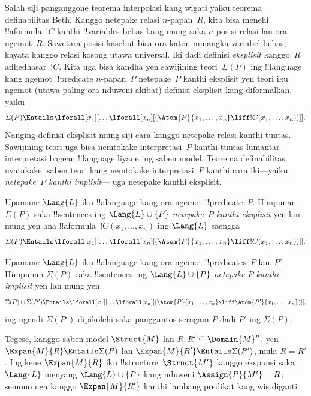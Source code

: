 \documentclass[../../../include/open-logic-section]{subfiles}
\begin{document}


Salah siji panganggone teorema interpolasi kang wigati yaiku
teorema definabilitas Beth. Kanggo netepake relasi
$n$-papan~$R$, kita bisa menehi !!a{formula}~$!C$
kanthi !!{variable}s bebas kang mung saka $n$ posisi relasi lan ora ngemot~$R$. Sawetara posisi kasebut bisa ora katon minangka variabel bebas, kayata kanggo relasi kosong utawa universal.
Iki dadi definisi \emph{eksplisit} kanggo~$R$ adhedhasar~$!C$.
Kita uga bisa kandha yen sawijining teori~$\Sigma(P)$
ing !!{language} kang ngemot !!{predicate}
$n$-papan~$P$ netepake~$P$ kanthi eksplisit yen teori iku
ngemot (utawa paling ora nduweni akibat) definisi
eksplisit kang diformalkan, yaiku
\[
\Sigma(P) \Entails \lforall[x_1][\dots
  \lforall[x_n][(\Atom{P}{x_1,\dots, x_n} \liff !C(x_1, \dots,
    x_n))]].
\]
Nanging definisi eksplisit mung siji cara kanggo
netepake relasi kanthi tuntas. Sawijining teori
uga bisa nemtokake interpretasi~$P$ kanthi tuntas
lumantar interpretasi bagean !!{language} liyane
ing saben model. Teorema definabilitas nyatakake:
saben teori kang nemtokake interpretasi~$P$
kanthi cara iki---yaiku \emph{netepake~$P$ kanthi implisit}---
uga netepake kanthi eksplisit.

\begin{defn}
Upamane $\Lang{L}$ iku !!a{language} kang ora ngemot
!!{predicate}~$P$. Himpunan $\Sigma(P)$ saka
!!{sentence}s ing $\Lang{L} \cup \{P\}$
\emph{netepake~$P$ kanthi eksplisit} yen lan mung yen
ana !!a{formula}~$!C(x_1, \dots, x_n)$ ing $\Lang{L}$
saengga
\[
\Sigma(P) \Entails \lforall[x_1][\dots
  \lforall[x_n][(\Atom{P}{x_1,\dots, x_n} \liff !C(x_1, \dots,
    x_n))]].
\]
\end{defn}

\begin{defn}
Upamane $\Lang{L}$ iku !!a{language} kang ora ngemot
!!{predicate}s~$P$ lan~$P'$. Himpunan $\Sigma(P)$
saka !!{sentence}s ing $\Lang{L} \cup \{P\}$
\emph{netepake $P$ kanthi implisit} yen lan mung yen
\[
\Sigma(P) \cup \Sigma(P') \Entails \lforall[x_1][\dots
  \lforall[x_n][(\Atom{P}{x_1,\dots, x_n} \liff \Atom{P'}{x_1,\dots,
      x_n})]],
\]
ing ngendi $\Sigma(P')$ dipikolehi saka panggantos
seragam $P$ dadi $P'$ ing $\Sigma(P)$.
\end{defn}

Tegese, kanggo saben model $\Struct{M}$ lan $R, R' \subseteq
\Domain{M}^n$, yen $\Expan{M}{R} \Entails \Sigma(P)$ lan
$\Expan{M}{R'} \Entails \Sigma(P')$, mula $R=R'$.
Ing kene $\Expan{M}{R}$ iku !!{structure}~$\Struct{M'}$
kanggo ekspansi saka $\Lang{L}$ menyang
$\Lang{L} \cup \{P\}$ kang nduweni
$\Assign{P}{M'} = R$; semono uga kanggo
$\Expan{M}{R'}$ kanthi lambang predikat kang wis diganti.
\end{document}
